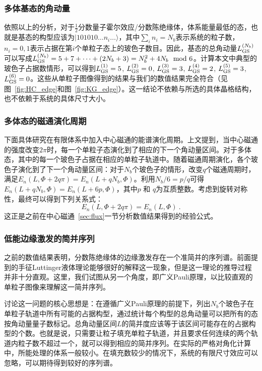 \subsubsection{多体基态的角动量}
依照以上的分析，对于$\frac{1}{2}$分数量子霍尔效应/分数陈绝缘体，体系能量最低的态，也就是基态的构型应该为$|101010 \ldots n_i \ldots \rangle$，其中$\sum_i n_i =N_b $表示系统的粒子数，$n_i = 0, 1$表示占据在第$i$个单粒子态上的玻色子数目。因此，基态的总角动量$L_{\rm GS}^{(N_b)}$可以写成$L_{\rm GS}^{(N_b)} = 5+7+\dots+(2N_b+3) = N_b^2 + 4N_b \mod 6$。计算本文中典型的玻色子占据数情形，可以得到$L_{\rm GS}^{(1)} = 5$, $L_{\rm GS}^{(2)} = 0$, $L_{\rm GS}^{(3)} = 3$, $L_{\rm GS}^{(4)} = 2$, $L_{\rm GS}^{(5)} = 3$, $L_{\rm GS}^{(6)} = 0$。这些从单粒子图像得到的结果与我们的数值结果完全符合（见图~\ref{fig:HC_edge}和图~\ref{fig:KG_edge}）。这一结论不依赖与所选的具体晶格结构，也不依赖于系统的具体尺寸大小。


\subsubsection{多体态的磁通演化周期}
下面具体研究在有限体系中加入中心磁通的能谱演化周期。上文提到，当中心磁通的强度改变$2\pi$时，每一个单粒子态演化到了相应的下一个角动量区间。对于多体态，其中的每一个玻色子占据在相应的单粒子轨道中。随着磁通周期演化，各个玻色子演化到了下一个角动量区间：对于$N_b$个玻色子的情形，改变$q$个磁通周期时，满足$E_n(L,\Phi+2q\pi)=E_n(L+qN_b,\Phi)$。利用$N_b/6=p/q$可得$E_n(L+qN_b,\Phi)=E_n(L+6p,\Phi)$，其中$p$ 和 $q$为互质整数。考虑到旋转对称性，最终可以得到下列关系式：
\[E_n(L,\Phi+2q\pi)=E_n(L,\Phi)~.\]
这正是之前在中心磁通~\ref{sec:flux}一节分析数值结果得到的经验公式。


\subsubsection{低能边缘激发的简并序列}
之前的数值结果表明，分数陈绝缘体的边缘激发存在一个准简并的序列谱。前面提到的手征Luttinger液体理论能够很好的解释这一现象，但是这一理论的推导过程并非十分直观。这里，我们试图从另一个角度，即广义Pauli原理，以比较直观的单粒子图像来理解这一简并序列。

讨论这一问题的核心思想是：在遵循广义Pauli原理的前提下，列出$N_b$个玻色子在单粒子轨道中所有可能的占据构型，通过统计每个构型的总角动量可以把所有的态按角动量量子数标记。总角动量区间$L$的简并度应该等于该区间可能存在的占据构型的个数。也就是说，只需要让粒子填充单粒子轨道，并且要求任何连续的两个轨道内粒子数不超过一个，就可以得到相应的简并序列。在实际的严格对角化计算中，所能处理的体系一般较小。在填充数较少的情况下，系统的有限尺寸效应可以忽略，可以期待得到较好的序列谱。

